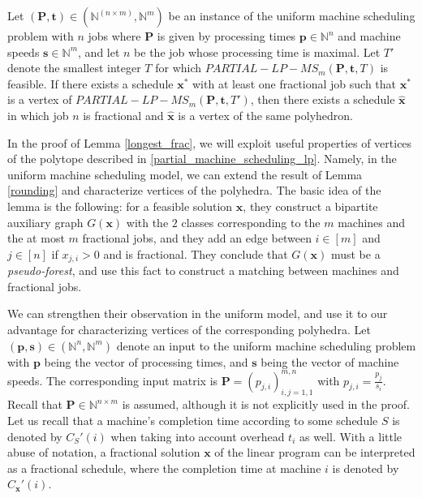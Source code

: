 \documentclass[a4paper,UKenglish,cleveref, autoref, thm-restate, pdfa]{lipics-v2021}
\theoremstyle{plain}
\begin{document}
\begin{lmm}\label{longest_frac}
   Let $({\bm{P}}, \bm{t}) \in (\mathbb{N}^{(n\times m)}, \mathbb{N}^m)$ be an instance of the uniform machine scheduling problem with $n$ jobs where $\bm{P}$ is given by processing times $\bm{p} \in \mathbb{N}^n$ and machine speeds $\bm{s}\in \mathbb{N}^m$, and let $n$ be the job whose processing time is maximal. Let $T'$ denote the smallest integer $T$ for which $PARTIAL-LP-MS_m (\bm{P}, \bm{t}, T)$ is feasible. If there exists a schedule $\bm{x}^*$ with at least one fractional job such that $\bm{x^*}$ is a vertex of $PARTIAL-LP-MS_m (\bm{P}, \bm{t}, T')$, then there exists a schedule $\bm{\hat{x}}$ in which job $n$ is fractional and $\bm{\hat{x}}$ is a vertex of the same polyhedron.
\end{lmm}

In the proof of Lemma \ref{longest_frac}, we will exploit useful properties of vertices of the polytope described in \eqref{partial_machine_scheduling_lp}. Namely, in the uniform machine scheduling model, we can extend the result of Lemma \ref{rounding} and characterize vertices of the polyhedra. The basic idea of the lemma is the following: for a feasible solution $\bm{x}$, they construct a bipartite auxiliary graph $G(\bm{x})$ with the $2$ classes corresponding to the $m$ machines and the at most $m$ fractional jobs, and they add an edge between $ i \in [m]$ and $j \in [n]$ if $x_{j, i} >0$ and is fractional. They conclude that $G(\bm{x})$ must be a \emph{pseudo-forest}, and use this fact to construct a matching between machines and fractional jobs. 

We can strengthen their observation in the uniform model, and use it to our advantage for characterizing vertices of the corresponding polyhedra. Let $(\bm{p}, \bm{s}) \in (\mathbb{N}^{n}, \mathbb{N}^{m})$ denote an input to the uniform machine scheduling problem with $\bm{p}$ being the vector of processing times, and $\bm{s}$ being the vector of machine speeds. The corresponding input matrix is $\bm{P} = (p_{j,i})_{i,j = 1, 1} ^{m, n}$ with $p_{j,i} = \frac{p_j}{s_i}$. Recall that $\bm{P} \in \mathbb{N}^{n \times m}$ is assumed, although it is not explicitly used in the proof. Let us recall that a machine's completion time according to some schedule $S$ is denoted by $C_S'(i)$ when taking into account overhead $t_i$ as well. With a little abuse of notation, a fractional solution $\bm{x}$ of the linear program can be interpreted as a fractional schedule, where the completion time at machine $i$ is denoted by $C_{\bm{x}}'(i)$.
\end{document}
